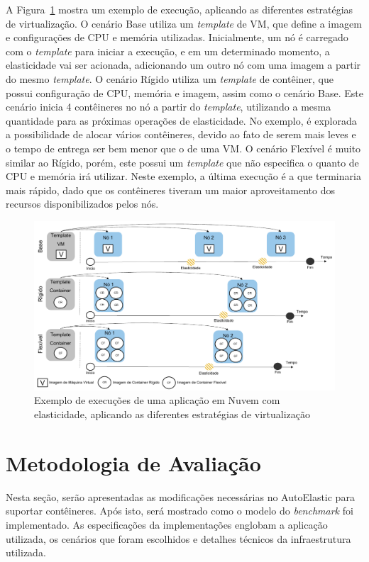 \documentclass[twoside,english,brazilian]{UNISINOSartigo}
\begin{document}
 A Figura~\ref{fig:exemplo} mostra um exemplo de execução, aplicando as diferentes estratégias de virtualização. O cenário Base utiliza um \textit{template} de VM, que define a imagem e configurações de CPU e memória utilizadas. Inicialmente, um nó é carregado com o \textit{template} para iniciar a execução, e em um determinado momento, a elasticidade vai ser acionada, adicionando um outro nó com uma imagem a partir do mesmo \textit{template}. O cenário Rígido utiliza um \textit{template} de contêiner, que possui configuração de CPU, memória e imagem, assim como o cenário Base. Este cenário inicia 4 contêineres no nó a partir do \textit{template}, utilizando a mesma quantidade para as próximas operações de elasticidade. No exemplo, é explorada a possibilidade de alocar vários contêineres, devido ao fato de serem mais leves e o tempo de entrega ser bem menor que o de uma VM. O cenário Flexível é muito similar ao Rígido, porém, este possui um \textit{template} que não especifica o quanto de CPU e memória irá utilizar. Neste exemplo, a última execução é a que terminaria mais rápido, dado que os contêineres tiveram um maior aproveitamento dos recursos disponibilizados pelos nós. 

\begin{figure}[ht!]
	\caption{Exemplo de execuções de uma aplicação em Nuvem com elasticidade, aplicando as diferentes estratégias de virtualização}
	\label{fig:exemplo}
	\centering%
	\begin{minipage}{1\textwidth}
		\includegraphics[width= 15cm]{images/exemplo}
	\end{minipage}
\end{figure}


\section{Metodologia de Avaliação}
\label{metodologia}
Nesta seção, serão apresentadas as modificações necessárias no AutoElastic para suportar contêineres. Após isto, será mostrado como o modelo do \textit{benchmark} foi implementado. As especificações da implementações englobam a aplicação utilizada, os cenários que foram escolhidos e detalhes técnicos da infraestrutura utilizada.
\end{document}
